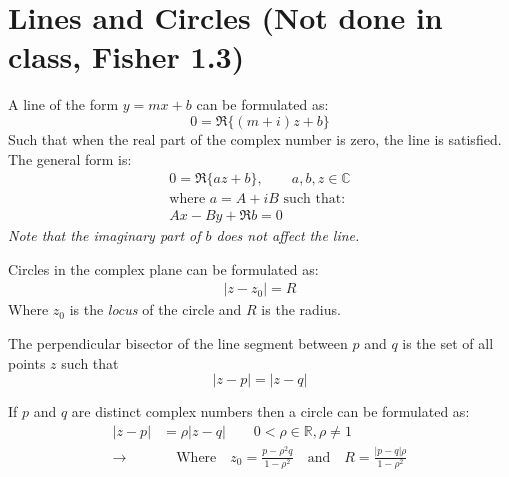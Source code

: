 \section{Lines and Circles (Not done in class, Fisher 1.3)}
\begin{definition}
    A line of the form $y= mx + b$ can be formulated as:
    \[
        0 = \Re\{(m + i)z + b\}
    \]
    Such that when the real part of the complex number is zero, the line is satisfied. The general form is:
    \begin{align}
        0 = \Re\{az + b\}, \qquad a, b, z \in \mathbb{C} \\
        \text{where } a = A + iB \text{ such that: }     \\
        Ax - By + \Re{b} = 0
    \end{align}
    \textit{Note that the imaginary part of $b$ does not affect the line.}
\end{definition}

\begin{definition}
    Circles in the complex plane can be formulated as:
    \begin{align}
        |z - z_0| = R
    \end{align}
    Where $z_0$ is the \textit{locus} of the circle and $R$ is the radius.
\end{definition}

\begin{definition}
    The perpendicular bisector of the line segment between $p$ and $q$ is the set of all points $z$ such that
    \[|z - p| = |z - q|\]
\end{definition}

\begin{corollary}
    If $p$ and $q$ are distinct complex numbers then a circle can be formulated as:
    \begin{align}
        |z - p|     & = \rho|z - q| \qquad 0 < \rho \in \mathbb{R}, \rho \neq 1                                                               \\
        \rightarrow & \quad \text{Where} \quad z_0 = \frac{p - \rho^2q}{1 - \rho^2} \quad \text{and} \quad R = \frac{|p - q|\rho}{1 - \rho^2}
    \end{align}

\end{corollary}